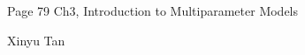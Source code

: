 \documentclass{article}
\begin{document}
\large %


{\Large Page 79 %
\hfill  Ch3, Introduction to Multiparameter Models}

\begin{center}
{\Large Xinyu Tan} 
\end{center}
\vspace{0.05in}

 \renewcommand{\labelitemi}{$\textendash$}
\end{document}

